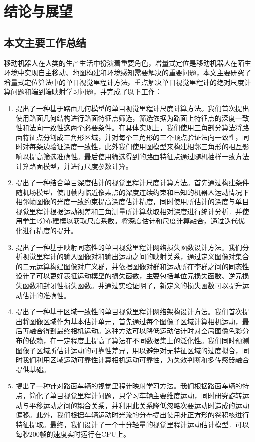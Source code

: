 \chapter{结论与展望}
\section{本文主要工作总结}
移动机器人在人类的生产生活中扮演着重要角色，增量式定位是移动机器人在陌生环境中实现自主移动、地图构建和环境感知需要解决的重要问题，本文主要研究了增量式定位算法中的单目视觉里程计方法，重点解决单目视觉里程计的绝对尺度计算问题和端到端映射学习问题，并完成了以下工作：
\begin{enumerate}
    \item 提出了一种基于路面几何模型的单目视觉里程计尺度计算方法。我们首次提出使用路面几何结构进行路面特征点筛选，筛选依据为路面上特征点的深度一致性和法向一致性这两个必要条件。在具体实现上，我们使用三角剖分算法将路面特征点分割成三角形区域，并对每个三角形的三个顶点验证法向一致性，同时对每条边验证深度一致性，此外我们使用图模型来构建相邻三角形的相互影响以提高筛选准确性。最后使用筛选得到的路面特征点通过随机抽样一致方法计算路面模型，并进行尺度参数计算。

    \item 提出了一种结合单目深度估计的视觉里程计尺度计算方法。首先通过构建条件随机场模型，使用帧内临近像素点的深度连续约束和已知的机器人运动情况下相邻帧图像的光度一致约束提高深度估计精度，同时使用所估计的深度与单目视觉里程计根据运动视差和三角测量所计算获取相对深度进行统计分析，并使用学生t分布建模以获取尺度系数。将深度估计和尺度计算融合，通过迭代优化进行精度的提升。
    
    \item 提出了一种基于映射同态性的单目视觉里程计网络损失函数设计方法。我们分析视觉里程计的输入图像对和输出运动之间的映射关系，通过定义图像对集合的二元运算构建图像对广义群，并依据图像对群和运动所在李群之间的同态性设计了可以更好表征运动模型的损失函数，主要包括单位元损失函数、逆元损失函数和封闭性损失函数。并通过实验证明了，新定义的损失函数可以提升运动估计的准确性。

    \item 提出了一种基于区域一致性的单目视觉里程计网络架构设计方法。我们首次提出将图像区域作为基本估计单元，首先通过每个图像子区域计算相机运动，最后再融合得到最终相机运动。这种方法可以降低运动估计时对全局图像色彩分布的依赖，在一定程度上提高了算法在不同数据集上的泛化性。我们同时预测图像子区域所估计运动的可靠性差异，用以避免对无特征区域的过度拟合，同时我们利用区域运动可靠性计算相机运动可靠性，为失效判断和多传感器融合提供基础。
    
    \item 提出了一种针对路面车辆的视觉里程计映射学习方法。我们根据路面车辆的特点，简化了单目视觉里程计问题，只学习车辆主要维度运动，同时研究旋转运动与平移运动之间的耦合关系，并利用此关系降低忽略次要运动时造成的运动偏移。此外，我们根据车辆运动时光流的分布提出使用非正方形的卷积核进行特征提取。最终，我们设计了一个十分轻量的视觉里程计运动估计模型，可以每秒200帧的速度实时运行在CPU上。
\end{enumerate}

